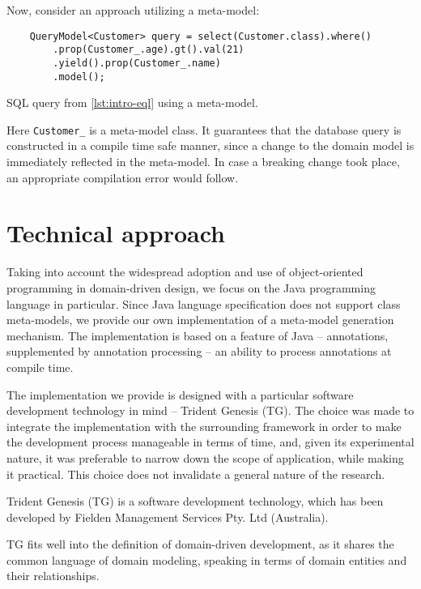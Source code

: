 \smallskip

Now, consider an approach utilizing a meta-model:

\begin{listing}[H]
    \begin{verbatim}
    QueryModel<Customer> query = select(Customer.class).where()
        .prop(Customer_.age).gt().val(21)
        .yield().prop(Customer_.name)
        .model();
    \end{verbatim}
    \caption{SQL query from \ref{lst:intro-eql} using a meta-model.}
    \label{lst:intro-sql-meta}
\end{listing}

Here \texttt{Customer\_} is a meta-model class. 
It guarantees that the database query is constructed in a compile time safe manner, since a change to the domain model is immediately reflected in the meta-model.
In case a breaking change took place, an appropriate compilation error would follow.

\section{Technical approach}
Taking into account the widespread adoption and use of object-oriented programming in domain-driven design, we focus on the Java programming language in particular.
Since Java language specification does not support class meta-models, we provide our own implementation of a meta-model generation mechanism. 
The implementation is based on a feature of Java -- annotations, supplemented by annotation processing -- an ability to process annotations at compile time.

\n

The implementation we provide is designed with a particular software development technology in mind – Trident Genesis (TG). The choice was made to integrate the implementation with the surrounding framework in order to make the development process manageable in terms of time, and, given its experimental nature, it was preferable to narrow down the scope of application, while making it practical. This choice does not invalidate a general nature of the research.

\n
Trident Genesis (TG) is a software development technology, which has been developed by Fielden Management Services Pty. Ltd (Australia).

\n

TG fits well into the definition of domain-driven development, as it shares the common language of domain modeling, speaking in terms of domain entities and their relationships.

